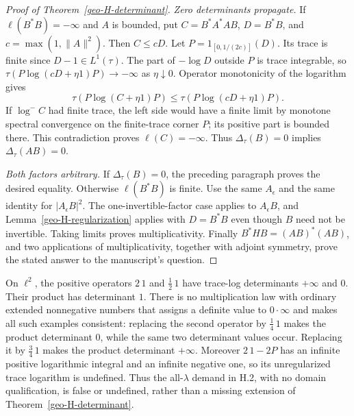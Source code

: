 \begin{proof}[Proof of Theorem~\ref{geo-H-determinant}]
\emph{Zero determinants propagate.} If $\ell(B^*B)=-\infty$ and $A$ is
bounded, put $C=B^*A^*AB$, $D=B^*B$, and $c=\max(1,\|A\|^2)$.
Then $C\leq cD$. Let $P=1_{[0,1/(2c)]}(D)$. Its trace is finite since
$D-1\in L^1(\tau)$. The part of $-\log D$ outside $P$ is trace integrable,
so $\tau(P\log(cD+\eta1)P)\to-\infty$ as $\eta\downarrow0$.
Operator monotonicity of the logarithm gives
\[
 \tau(P\log(C+\eta1)P)
 \leq\tau(P\log(cD+\eta1)P).
\]
If $\log^-C$ had finite trace, the left side would have a finite limit by
monotone spectral convergence on the finite-trace corner $P$; its positive
part is bounded there. This contradiction proves $\ell(C)=-\infty$.
Thus $\Delta_\tau(B)=0$ implies $\Delta_\tau(AB)=0$.

\emph{Both factors arbitrary.} If $\Delta_\tau(B)=0$, the preceding
paragraph proves the desired equality. Otherwise $\ell(B^*B)$ is finite.
Use the same $A_\epsilon$ and the same identity for $|A_\epsilon B|^2$.
The one-invertible-factor case applies to $A_\epsilon B$, and
Lemma~\ref{geo-H-regularization} applies with $D=B^*B$ even though $B$
need not be invertible. Taking limits proves multiplicativity. Finally
$B^*HB=(AB)^*(AB)$, and two applications of multiplicativity, together
with adjoint symmetry, prove the stated answer to the manuscript's question.
\end{proof}

\begin{example}
\label{geo-H-all-scalars}
On $\ell^2$, the positive operators $2\,1$ and $\tfrac12\,1$ have trace-log
determinants $+\infty$ and $0$. Their product has determinant $1$.
There is no multiplication law with ordinary extended nonnegative numbers
that assigns a definite value to $0\cdot\infty$ and makes all such examples
consistent: replacing the second operator by $\tfrac14\,1$ makes the
product determinant $0$, while the same two determinant values occur.
Replacing it by $\tfrac34\,1$ makes the product determinant $+\infty$.
Moreover $2\,1-2P$ has an infinite positive logarithmic integral and an
infinite negative one, so its unregularized trace logarithm is undefined.
Thus the all-$\lambda$ demand in H.2, with no domain qualification, is false
or undefined, rather than a missing extension of
Theorem~\ref{geo-H-determinant}.
\end{example}

